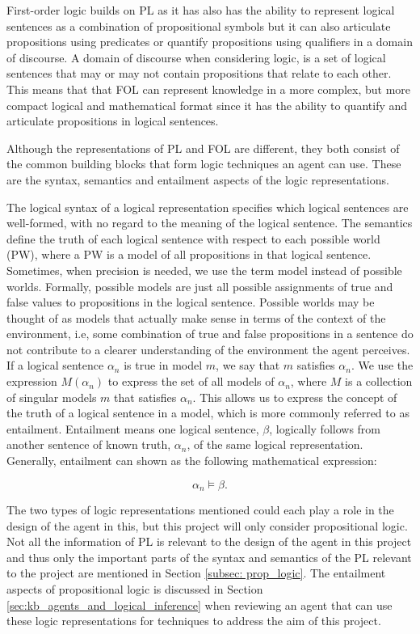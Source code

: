 First-order logic builds on PL as it has also has the ability to represent logical sentences as a combination of propositional symbols but it can also articulate propositions using predicates or quantify propositions using qualifiers in a domain of discourse. A domain of discourse when considering logic, is a set of logical sentences that may or may not contain propositions that relate to each other. This means that that FOL can represent knowledge in a more complex, but more compact logical and mathematical format since it has the ability to quantify and articulate propositions in logical sentences. 

Although the representations of PL and FOL are different, they both consist of the common building blocks that form logic techniques an agent can use. These are the syntax, semantics and entailment aspects of the logic representations.

The logical syntax of a logical representation specifies which logical sentences are well-formed, with no regard to the meaning of the logical sentence.
The semantics define the truth of each logical sentence with respect to each possible world (PW), where a PW is a model of all propositions in that logical sentence. Sometimes, when precision is needed, we use the term model instead of possible worlds. Formally, possible models are just all possible assignments of true and false values to propositions in the logical sentence. Possible worlds may be thought of as models that actually make sense in terms of the context of the environment, i.e, some combination of true and false propositions in a sentence do not contribute to a clearer understanding of the environment the agent perceives.
If a logical sentence $\alpha_n$ is true in model $m$, we say that $m$ satisfies $\alpha_n$. 
We use the expression $M(\alpha_n)$ to express the set of all models of $\alpha_n$, where $M$ is a collection of singular models $m$ that satisfies $\alpha_n$. This allows us to express the concept of the truth of a logical sentence in a model, which is more commonly referred to as entailment.  Entailment means one logical sentence, $\beta$, logically follows from another sentence of known truth,  $\alpha_n$,  of the same logical representation. Generally, entailment can shown as the following mathematical expression:

\begin{equation}
	\alpha_n \models \beta.
	\label{eq:entailment}
\end{equation}


The two types of logic representations mentioned could each play a role in the design of the  agent in this, but this project will only consider propositional logic. Not all the information of PL is relevant to the design of the agent in this project and thus only the important parts of the syntax and semantics of the PL relevant to the project are mentioned in Section \ref{subsec: prop_logic}.
The entailment aspects of propositional logic  is discussed in Section \ref{sec:kb_agents_and_logical_inference} when reviewing an agent that can use these logic representations for techniques to address the aim of this project.


